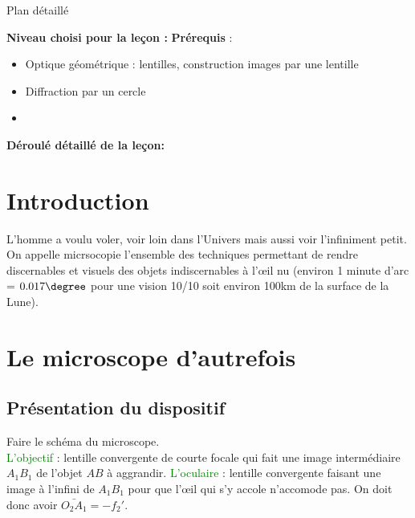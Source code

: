 \begin{reportBlock}{Plan détaillé}

  \textbf{Niveau choisi pour la leçon :} 
  \newline
  \textbf{Prérequis} : \begin{itemize}
      \item Optique géométrique : lentilles, construction images par une lentille
      \item Diffraction par un cercle
      \item 
  \end{itemize}

  \textbf{Déroulé détaillé de la leçon: }  
  
  \section*{Introduction}
  L'homme a voulu voler, voir loin dans l'Univers mais aussi voir l'infiniment petit.\\
  On appelle micrsocopie l'ensemble des techniques permettant de rendre discernables et visuels des objets indiscernables à l'\oe il nu (environ 1 minute d'arc = $0.017\degree$ pour une vision 10/10 soit environ 100km de la surface de la Lune). 

  \section{Le microscope \og d'autrefois \fg }

  \subsection{Présentation du dispositif}
  Faire le schéma du microscope.\\
  \textcolor{green}{L'objectif} : lentille convergente de courte focale qui fait une image intermédiaire $A_1B_1$ de l'objet $AB$ à aggrandir. \textcolor{green}{L'oculaire} : lentille convergente faisant une image à l'infini de $A_1B_1$ pour que l'\oe il qui s'y accole n'accomode pas. On doit donc avoir $\bar{O_2A_1}=-f_2'$.


\end{reportBlock}
